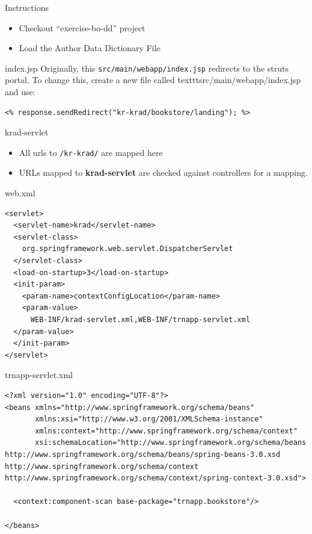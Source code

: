 \documentclass[xcolor=dvipsnames,14pt,professionalfonts]{beamer}
\begin{document}
\begin{frame}{Instructions}
  \begin{itemize}
  \item Checkout “exercise-bo-dd” project
  \item Load the Author Data Dictionary File
  \end{itemize}
\end{frame}

\begin{frame}[fragile]{index.jsp}
  Originally, this \texttt{src/main/webapp/index.jsp} redirects to the struts portal. To change
  this, create a new file called texttt{src/main/webapp/index.jsp} and
  use:
    \begin{verbatim}
<% response.sendRedirect("kr-krad/bookstore/landing"); %>
    \end{verbatim}
\end{frame}

\begin{frame}{krad-servlet}
  \begin{itemize}
  \item All urls to \texttt{/kr-krad/} are mapped here
  \item URLs mapped to \textbf{krad-servlet} are checked against
    controllers for a mapping.
  \end{itemize}
\end{frame}

\begin{frame}[fragile]{web.xml}
    \begin{verbatim}
<servlet>
  <servlet-name>krad</servlet-name>
  <servlet-class>
    org.springframework.web.servlet.DispatcherServlet
  </servlet-class>
  <load-on-startup>3</load-on-startup>
  <init-param>
    <param-name>contextConfigLocation</param-name>
    <param-value>
      WEB-INF/krad-servlet.xml,WEB-INF/trnapp-servlet.xml
  </param-value>    
  </init-param>
</servlet>
    \end{verbatim}
\end{frame}

\begin{frame}[fragile]{trnapp-servlet.xml}
    \begin{verbatim}
<?xml version="1.0" encoding="UTF-8"?>
<beans xmlns="http://www.springframework.org/schema/beans"
       xmlns:xsi="http://www.w3.org/2001/XMLSchema-instance"
       xmlns:context="http://www.springframework.org/schema/context"
       xsi:schemaLocation="http://www.springframework.org/schema/beans
http://www.springframework.org/schema/beans/spring-beans-3.0.xsd
http://www.springframework.org/schema/context
http://www.springframework.org/schema/context/spring-context-3.0.xsd">

  <context:component-scan base-package="trnapp.bookstore"/>
  
</beans>
    \end{verbatim}
\end{frame}
\end{document}

